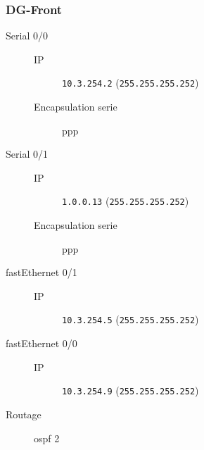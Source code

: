 \subsubsection{DG-Front}

	\begin{description}
		\item[Serial 0/0] 
		\begin{description}
			\item[IP] \texttt{10.3.254.2} (\texttt{255.255.255.252})
			\item[Encapsulation serie] ppp
		\end{description}

		\item[Serial 0/1] 
		\begin{description}
			\item[IP] \texttt{1.0.0.13} (\texttt{255.255.255.252})
			\item[Encapsulation serie] ppp
		\end{description}

		\item[fastEthernet 0/1] 
		\begin{description}
			\item[IP] \texttt{10.3.254.5} (\texttt{255.255.255.252})
		\end{description}

		\item[fastEthernet 0/0] 
		\begin{description}
			\item[IP] \texttt{10.3.254.9} (\texttt{255.255.255.252})
		\end{description}

		\item[Routage] ospf 2
	\end{description}
